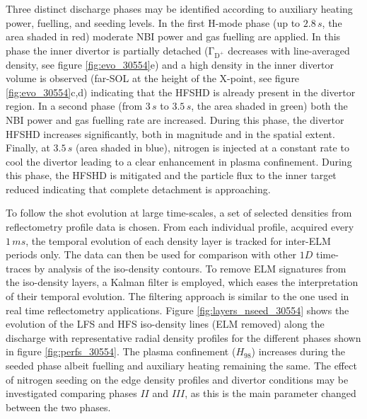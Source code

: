 \documentclass[12pt]{iopart}
\begin{document}
Three distinct discharge phases may be identified according to auxiliary heating power, fuelling, and seeding levels. In the first H-mode phase (up to $2.8\,s$, the area shaded in red) moderate NBI power and gas fuelling are applied. In this phase the inner divertor is partially detached ($\mathrm{\Gamma_{D^{+}}}$ decreases with line-averaged density, see figure \ref{fig:evo_30554}e) and a high density in the inner divertor volume is observed (far-SOL at the height of the X-point, see figure \ref{fig:evo_30554}c,d) indicating that the HFSHD is already present in the divertor region. In a second phase (from $3\,s$ to $3.5\,s$, the area shaded in green) both the NBI power and gas fuelling rate are increased. During this phase, the divertor HFSHD increases significantly, both in magnitude and in the spatial extent. Finally, at $3.5\,s$ (area shaded in blue), nitrogen is injected at a constant rate to cool the divertor leading to a clear enhancement in plasma confinement. During this phase, the HFSHD is mitigated and the particle flux to the inner target reduced indicating that complete detachment is approaching.

To follow the shot evolution at large time-scales, a set of selected densities from reflectometry profile data is chosen. From each individual profile, acquired every $1\,ms$, the temporal evolution of each density layer is tracked for inter-ELM periods only. The data can then be used for comparison with other $1D$ time-traces by analysis of the iso-density contours. To remove ELM signatures from the iso-density layers, a Kalman filter\cite{kalman1960new} is employed, which eases the interpretation of their temporal evolution. The filtering approach is similar to the one used in real time reflectometry applications\cite{Santos2012}. Figure \ref{fig:layers_nseed_30554} shows the evolution of the LFS and HFS iso-density lines (ELM removed) along the discharge with representative radial density profiles for the different phases shown in figure \ref{fig:perfs_30554}. The plasma confinement ($H_{98}$) increases during the seeded phase albeit fuelling and auxiliary heating remaining the same. The effect of nitrogen seeding on the edge density profiles and divertor conditions may be investigated comparing phases $II$ and $III$, as this is the main parameter changed between the two phases.
\end{document}
